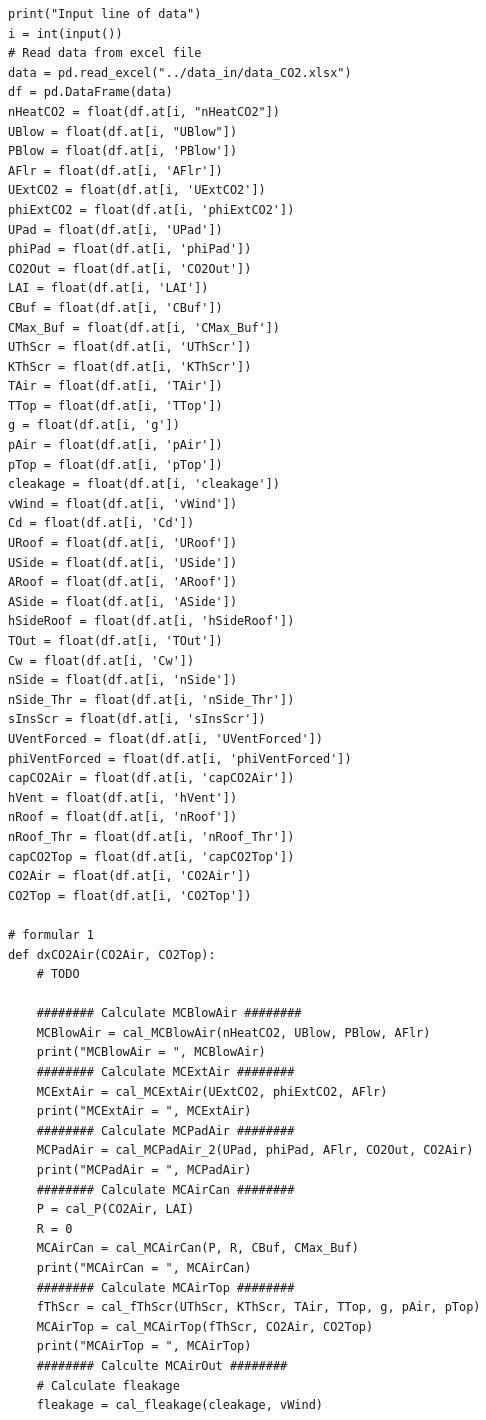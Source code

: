 \documentclass[a4paper]{article}
\begin{document}
\begin{verbatim}
print("Input line of data")
i = int(input())
# Read data from excel file
data = pd.read_excel("../data_in/data_CO2.xlsx")
df = pd.DataFrame(data)
nHeatCO2 = float(df.at[i, "nHeatCO2"])
UBlow = float(df.at[i, "UBlow"])
PBlow = float(df.at[i, 'PBlow'])
AFlr = float(df.at[i, 'AFlr'])
UExtCO2 = float(df.at[i, 'UExtCO2'])
phiExtCO2 = float(df.at[i, 'phiExtCO2'])
UPad = float(df.at[i, 'UPad'])
phiPad = float(df.at[i, 'phiPad'])
CO2Out = float(df.at[i, 'CO2Out'])
LAI = float(df.at[i, 'LAI'])
CBuf = float(df.at[i, 'CBuf'])
CMax_Buf = float(df.at[i, 'CMax_Buf'])
UThScr = float(df.at[i, 'UThScr'])
KThScr = float(df.at[i, 'KThScr'])
TAir = float(df.at[i, 'TAir'])
TTop = float(df.at[i, 'TTop'])
g = float(df.at[i, 'g'])
pAir = float(df.at[i, 'pAir'])
pTop = float(df.at[i, 'pTop'])
cleakage = float(df.at[i, 'cleakage'])
vWind = float(df.at[i, 'vWind'])
Cd = float(df.at[i, 'Cd'])
URoof = float(df.at[i, 'URoof'])
USide = float(df.at[i, 'USide'])
ARoof = float(df.at[i, 'ARoof'])
ASide = float(df.at[i, 'ASide'])
hSideRoof = float(df.at[i, 'hSideRoof'])
TOut = float(df.at[i, 'TOut'])
Cw = float(df.at[i, 'Cw'])
nSide = float(df.at[i, 'nSide'])
nSide_Thr = float(df.at[i, 'nSide_Thr'])
sInsScr = float(df.at[i, 'sInsScr'])
UVentForced = float(df.at[i, 'UVentForced'])
phiVentForced = float(df.at[i, 'phiVentForced'])
capCO2Air = float(df.at[i, 'capCO2Air'])
hVent = float(df.at[i, 'hVent'])
nRoof = float(df.at[i, 'nRoof'])
nRoof_Thr = float(df.at[i, 'nRoof_Thr'])
capCO2Top = float(df.at[i, 'capCO2Top'])
CO2Air = float(df.at[i, 'CO2Air'])
CO2Top = float(df.at[i, 'CO2Top'])

# formular 1
def dxCO2Air(CO2Air, CO2Top):
    # TODO

    ######## Calculate MCBlowAir ########
    MCBlowAir = cal_MCBlowAir(nHeatCO2, UBlow, PBlow, AFlr)
    print("MCBlowAir = ", MCBlowAir)
    ######## Calculate MCExtAir ########
    MCExtAir = cal_MCExtAir(UExtCO2, phiExtCO2, AFlr)
    print("MCExtAir = ", MCExtAir)
    ######## Calculate MCPadAir ########
    MCPadAir = cal_MCPadAir_2(UPad, phiPad, AFlr, CO2Out, CO2Air)
    print("MCPadAir = ", MCPadAir)
    ######## Calculate MCAirCan ########
    P = cal_P(CO2Air, LAI)
    R = 0
    MCAirCan = cal_MCAirCan(P, R, CBuf, CMax_Buf)
    print("MCAirCan = ", MCAirCan)
    ######## Calculate MCAirTop ########
    fThScr = cal_fThScr(UThScr, KThScr, TAir, TTop, g, pAir, pTop)
    MCAirTop = cal_MCAirTop(fThScr, CO2Air, CO2Top)
    print("MCAirTop = ", MCAirTop)
    ######## Calculte MCAirOut ########
    # Calculate fleakage
    fleakage = cal_fleakage(cleakage, vWind)


\end{verbatim}
\end{document}
